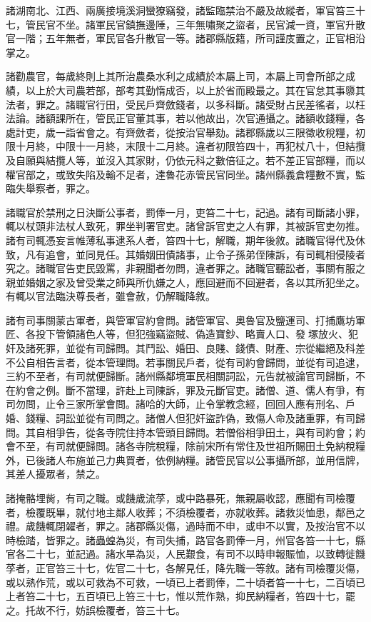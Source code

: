 \begin{pinyinscope}
 諸湖南北、江西、兩廣接境溪洞蠻獠竊發，諸監臨禁治不嚴及故縱者，軍官笞三十七，管民官不坐。諸軍民官鎮撫邊陲，三年無嘯聚之盜者，民官減一資，軍官升散官一階；五年無者，軍民官各升散官一等。諸郡縣版籍，所司謹庋置之，正官相沿掌之。



 諸勸農官，每歲終則上其所治農桑水利之成績於本屬上司，本屬上司會所部之成績，以上於大司農若部，部考其勤惰成否，以上於省而殿最之。其在官怠其事隳其法者，罪之。諸職官行田，受民戶齊斂錢者，以多科斷。諸受財占民差徭者，以枉法論。諸額課所在，管民正官董其事，若以他故出，次官通攝之。諸額收錢糧，各處計吏，歲一詣省會之。有齊斂者，從按治官舉劾。諸郡縣歲以三限徵收稅糧，初限十月終，中限十一月終，末限十二月終。違者初限笞四十，再犯杖八十，但結攬及自願與結攬人等，並沒入其家財，仍依元科之數倍征之。若不差正官部糧，而以權官部之，或致失陷及輸不足者，達魯花赤管民官同坐。諸州縣義倉糧數不實，監臨失舉察者，罪之。



 諸職官於禁刑之日決斷公事者，罰俸一月，吏笞二十七，記過。諸有司斷諸小罪，輒以杖頭非法杖人致死，罪坐判署官吏。諸曾訴官吏之人有罪，其被訴官吏勿推。諸有司輒憑妄言帷薄私事逮系人者，笞四十七，解職，期年後敘。諸職官得代及休致，凡有追會，並同見任。其婚姻田債諸事，止令子孫弟侄陳訴，有司輒相侵陵者究之。諸職官告吏民毀罵，非親聞者勿問，違者罪之。諸職官聽訟者，事關有服之親並婚姻之家及曾受業之師與所仇嫌之人，應回避而不回避者，各以其所犯坐之。有輒以官法臨決尊長者，雖會赦，仍解職降敘。



 諸有司事關蒙古軍者，與管軍官約會問。諸管軍官、奧魯官及鹽運司、打捕鷹坊軍匠、各投下管領諸色人等，但犯強竊盜賊、偽造寶鈔、略賣人口、發塚放火、犯奸及諸死罪，並從有司歸問。其鬥訟、婚田、良賤、錢債、財產、宗從繼絕及科差不公自相告言者，從本管理問。若事關民戶者，從有司約會歸問，並從有司追逮，三約不至者，有司就便歸斷。諸州縣鄰境軍民相關詞訟，元告就被論官司歸斷，不在約會之例。斷不當理，許赴上司陳訴，罪及元斷官吏。諸僧、道、儒人有爭，有司勿問，止令三家所掌會問。諸哈的大師，止令掌教念經，回回人應有刑名、戶婚、錢糧、詞訟並從有司問之。諸僧人但犯奸盜詐偽，致傷人命及諸重罪，有司歸問。其自相爭告，從各寺院住持本管頭目歸問。若僧俗相爭田土，與有司約會；約會不至，有司就便歸問。諸各寺院稅糧，除前宋所有常住及世祖所賜田土免納稅糧外，已後諸人布施並己力典買者，依例納糧。諸管民官以公事攝所部，並用信牌，其差人擾眾者，禁之。



 諸掩骼埋胔，有司之職。或饑歲流莩，或中路暴死，無親屬收認，應聞有司檢覆者，檢覆既畢，就付地主鄰人收葬；不須檢覆者，亦就收葬。諸救災恤患，鄰邑之禮。歲饑輒閉糴者，罪之。諸郡縣災傷，過時而不申，或申不以實，及按治官不以時檢踏，皆罪之。諸蟲蝗為災，有司失捕，路官各罰俸一月，州官各笞一十七，縣官各二十七，並記過。諸水旱為災，人民艱食，有司不以時申報賑恤，以致轉徙饑莩者，正官笞三十七，佐官二十七，各解見任，降先職一等敘。諸有司檢覆災傷，或以熟作荒，或以可救為不可救，一頃已上者罰俸，二十頃者笞一十七，二百頃已上者笞二十七，五百頃已上笞三十七，惟以荒作熟，抑民納糧者，笞四十七，罷之。托故不行，妨誤檢覆者，笞三十七。




\end{pinyinscope}
